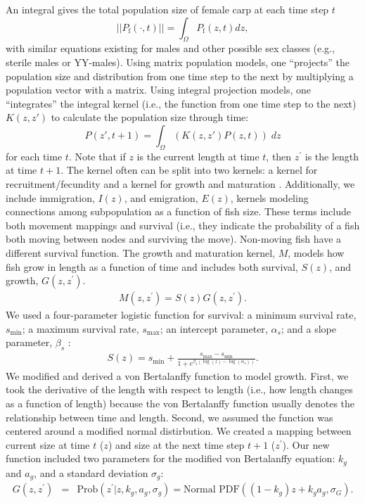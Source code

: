 \documentclass{article}[12pt]
\begin{document}
An integral gives the total population size of female carp at each time step \(t\)
\begin{equation*}
||P_{\text{f}}(\cdot, t)|| = \int_{\Omega}P_{\text{f}}(z, t) dz,
\end{equation*}
with similar equations existing for males and other possible sex classes (e.g., sterile males or YY-males).
Using matrix population models, one ``projects'' the population size and distribution from one time step to the next by multiplying a population vector with a matrix.
Using integral projection models, one ``integrates'' the integral kernel (i.e., the function from one time step to the next) \(K(z,z')\) to calculate the population size through time: 
\begin{equation*}
P(z', t+1) = \int_{\Omega} (K(z, z')P(z, t))\; dz
\end{equation*}
for each time \(t\). 
Note that if \(z\) is the current length at time \(t\), then \(z^\prime\) is the length at time \(t+1\).
The kernel often can be split into two kernels: a kernel for recruitment/fecundity and a kernel for growth and maturation \citep{ellner2006integral}.  
Additionally, we include immigration, \(I(z)\), and emigration, \(E(z)\), kernels modeling connections among subpopulation as a function of fish size.
These terms include both movement mappings and survival  (i.e., they indicate the probability of a fish both moving between nodes and surviving the move).
Non-moving fish have a different survival function.
The growth and maturation kernel, \(M\), models how fish grow in length as a function of time and includes both survival, \(S(z)\), and growth, \(G(z, z^\prime)\). 
\begin{eqnarray}
M(z, z^\prime) = S(z) G(z, z^\prime).\label{eqn:growMat}
\end{eqnarray}
We used a four-parameter logistic function for survival:
a minimum survival rate, \(s_\text{min}\); 
a maximum survival rate, \(s_\text{max}\);
an intercept parameter, \(\alpha_s\); and 
a slope parameter, \(\beta_s\) \citep{bolker2008ecological}:
\begin{eqnarray}
S(z) = s_\text{min} + \frac{s_\text{max} - s_\text{min}}{ 1 + e^{\beta_s (\log(z) - \log(\alpha_s))}}. \label{eqn:surlog}
\end{eqnarray}
We modified and derived a von Bertalanffy function to model growth.
First, we took the derivative of the length with respect to length (i.e., how length changes as a function of length) because the von Bertalanffy function usually denotes the relationship between time and length.
Second, we assumed the function was centered around a modified normal distirbution. 
We created a mapping between current size at time \(t\) (\(z\)) and size at the next time step \(t+1\) (\(z^\prime\)).
Our new function included two parameters for the modified von Bertalanffy equation: \(k_g\) and \(a_g\), and a standard deviation \(\sigma_g\):
\begin{eqnarray}
G(z, z^\prime) &=&  \text{Prob}(z^\prime | z, k_g, a_g, \sigma_g) = \text{Normal PDF}((1 - k_g) z + k_g  a_g , \sigma_G).\label{eqn:Growth}
\end{eqnarray}
\end{document}
